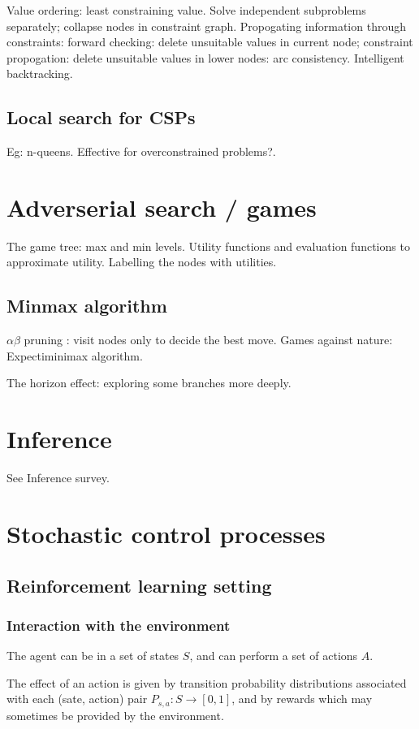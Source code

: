 \documentclass[oneside, article]{memoir}
\begin{document}
Value ordering: least constraining value. Solve independent subproblems separately; collapse nodes in constraint graph. Propogating information through constraints: forward checking: delete unsuitable values in current node; constraint propogation: delete unsuitable values in lower nodes: arc consistency.  Intelligent backtracking.

\section{Local search for CSPs}
Eg: n-queens. Effective for overconstrained problems?.

\chapter{Adverserial search / games}
The game tree: max and min levels. Utility functions and evaluation functions to approximate utility. Labelling the nodes with utilities.

\section{Minmax algorithm}
$\alpha \beta$ pruning : visit nodes only to decide the best move. Games against nature: Expectiminimax algorithm.

The horizon effect: exploring some branches more deeply.

\chapter{Inference}
See Inference survey.

\chapter{Stochastic control processes}
\section{Reinforcement learning setting}
\subsection{Interaction with the environment}
The agent can be in a set of states $S$, and can perform a set of actions $A$.

The effect of an action is given by transition probability distributions associated with each (sate, action) pair $P_{s, a}:S \to [0, 1]$, and by rewards which may sometimes be provided by the environment.
\end{document}
